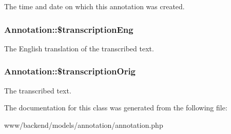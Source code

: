 The time and date on which this annotation was created. \hypertarget{classAnnotation_a6e3f1b607ba4f17cb01ea41d0cc98b4e}{
\subsubsection[{\$transcriptionEng}]{\setlength{\rightskip}{0pt plus 5cm}Annotation::\$transcriptionEng}}
\label{classAnnotation_a6e3f1b607ba4f17cb01ea41d0cc98b4e}
The English translation of the transcribed text. \hypertarget{classAnnotation_a93dabd9816dace28738c2b1a9d4c785d}{
\subsubsection[{\$transcriptionOrig}]{\setlength{\rightskip}{0pt plus 5cm}Annotation::\$transcriptionOrig}}
\label{classAnnotation_a93dabd9816dace28738c2b1a9d4c785d}
The transcribed text. 

The documentation for this class was generated from the following file:\begin{DoxyCompactItemize}
\item 
www/backend/models/annotation/annotation.php\end{DoxyCompactItemize}
